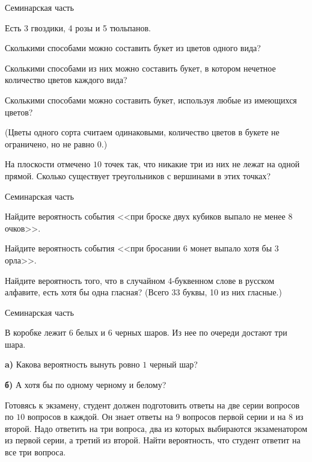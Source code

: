 \begin{frame}{Семинарская часть}

\z Есть 3 гвоздики, 4 розы и 5 тюльпанов.

\p Сколькими способами можно составить букет из цветов одного вида?

\p Сколькими способами из них можно составить букет, в котором нечетное количество цветов каждого вида?

\p Сколькими способами можно составить букет, используя любые из
имеющихся цветов?

(Цветы одного сорта считаем одинаковыми, количество цветов в букете не ограничено, но не равно 0.)

\z На плоскости отмечено $10$ точек так, что никакие три из них не лежат на одной прямой. Сколько существует треугольников с вершинами в этих точках?


\end{frame}

\begin{frame}{Семинарская часть}

\z Найдите вероятность события <<при броске двух кубиков выпало не
менее $8$ очков>>.

\z Найдите вероятность события <<при бросании 6 монет выпало хотя бы $3$ орла>>.

\z Найдите вероятность того, что в случайном 4-буквенном слове в русском алфавите, есть хотя бы одна гласная? (Всего 33 буквы, 10 из них
гласные.)

\end{frame}

\begin{frame}{Семинарская часть}

\z В коробке лежит $6$ белых и $6$ черных шаров. Из нее по очереди достают три шара.

{\bf a)} Какова вероятность вынуть ровно $1$ черный шар?

{\bf б)} А хотя бы по одному черному и белому?


\z Готовясь к экзамену, студент должен подготовить ответы на две серии вопросов по $10$ вопросов в каждой. Он знает ответы на $9$ вопросов первой серии и на $8$ из второй. Надо ответить на три вопроса, два из которых выбираются экзаменатором из первой серии, а третий из второй. Найти вероятность, что студент ответит на все три вопроса.

\end{frame}

